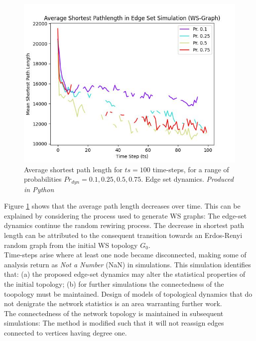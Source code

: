 \documentclass[
	a4paper, %
	10pt, %
	unnumberedsections, %
	twoside, %
]{LTJournalArticle}
\begin{document}
\begin{figure}[H]
	\includegraphics[width=\linewidth]{Figures/esd/lengths.jpg}
	\caption{Average shortest path length for \(ts = 100\) time-steps, for a range of probabilities \(Pr_{dyn} = 0.1, 0.25, 0.5, 0.75\). Edge set dynamics. \emph{Produced in Python}}
	\label{fig:esd_lengths}
\end{figure}

Figure \ref{fig:esd_lengths} shows that the average path length decreases over time. This can be explained by considering the process used to generate WS graphs: The edge-set dynamics continue the random rewiring process. The decrease in shortest path length can be attributed to the consequent transition towards an Erdos-Renyi random graph from the initial WS topology \(G_{0}\). \\

Time-steps arise where at least one node became disconnected, making some of analysis return as \emph{Not a Number} (NaN) in simulations. This simulation identifies that: (a) the proposed edge-set dynamics may alter the statistical properties of the initial topology; (b) for further simulations the connectedness of the toopology must be maintained.  Design of models of topological dynamics that do not denigrate the network statistics is an area warranting further work. \\

The connectedness of the network topology is maintained in subsequent simulations: The method is modified such that it will not reassign edges connected to vertices having  degree one.\\
\end{document}
